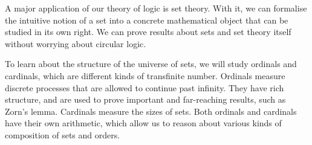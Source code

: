 A major application of our theory of logic is set theory.
With it, we can formalise the intuitive notion of a set into a concrete mathematical object that can be studied in its own right.
We can prove results about sets and set theory itself without worrying about circular logic.

To learn about the structure of the universe of sets, we will study ordinals and cardinals, which are different kinds of transfinite number.
Ordinals measure discrete processes that are allowed to continue past infinity.
They have rich structure, and are used to prove important and far-reaching results, such as Zorn's lemma.
Cardinals measure the sizes of sets.
Both ordinals and cardinals have their own arithmetic, which allow us to reason about various kinds of composition of sets and orders.




